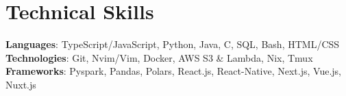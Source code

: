\section{Technical Skills}
\begin{itemize}[leftmargin=0.15in, label={}]
	\small{\item{
	      \textbf{Languages}{: TypeScript/JavaScript, Python, Java, C, SQL, Bash, HTML/CSS } \\
        \textbf{Technologies}{: Git, Nvim/Vim, Docker, AWS S3 \& Lambda, Nix, Tmux } \\
        \textbf{Frameworks}{: Pyspark, Pandas, Polars, React.js, React-Native, Next.js, Vue.js, Nuxt.js}}}
\end{itemize}
